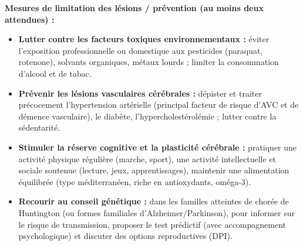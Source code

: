 \documentclass[11pt]{article}
\begin{document}
\begin{corrige}
\begin{center}
\begin{tabularx}{\linewidth}{|l|X|X|X|}
\hline
\end{tabularx}
\end{center}
\textbf{Mesures de limitation des lésions / prévention (au moins deux attendues) :}
\begin{itemize}
\item \textbf{Lutter contre les facteurs toxiques environnementaux :} éviter l'exposition professionnelle ou domestique aux pesticides (paraquat, rotenone), solvants organiques, métaux lourds ; limiter la consommation d'alcool et de tabac.
\item \textbf{Prévenir les lésions vasculaires cérébrales :} dépister et traiter précocement l'hypertension artérielle (principal facteur de risque d'AVC et de démence vasculaire), le diabète, l'hypercholestérolémie ; lutter contre la sédentarité.
\item \textbf{Stimuler la réserve cognitive et la plasticité cérébrale :} pratiquer une activité physique régulière (marche, sport), une activité intellectuelle et sociale soutenue (lecture, jeux, apprentissages), maintenir une alimentation équilibrée (type méditerranéen, riche en antioxydants, oméga-3).
\item \textbf{Recourir au conseil génétique :} dans les familles atteintes de chorée de Huntington (ou formes familiales d'Alzheimer/Parkinson), pour informer sur le risque de transmission, proposer le test prédictif (avec accompagnement psychologique) et discuter des options reproductives (DPI).
\end{itemize}
\end{corrige}
\end{document}
